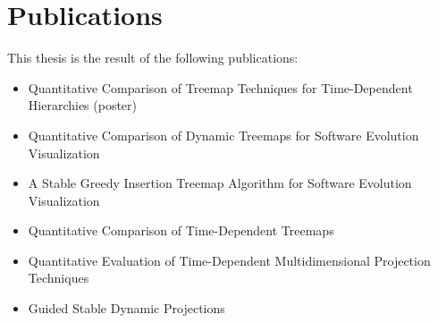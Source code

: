 \begingroup
\let\clearpage\relax
\let\cleardoublepage\relax
\let\cleardoublepage\relax

\manualmark
{} 

\chapter*{Publications}
This thesis is the result of the following publications:
\begin{itemize}
\item Quantitative Comparison of Treemap Techniques for Time-Dependent Hierarchies (poster) ~\citep{vernier17}
\item Quantitative Comparison of Dynamic Treemaps for Software Evolution Visualization~\citep{vernier18software}
\item A Stable Greedy Insertion Treemap Algorithm for Software Evolution Visualization~\citep{vernier18git}
\item Quantitative Comparison of Time-Dependent Treemaps~\citep{vernier_treemap}
\item Quantitative Evaluation of Time-Dependent Multidimensional Projection Techniques~\citep{Vernier2020}
\item Guided Stable Dynamic Projections~\citep{Vernier2021}
\end{itemize}


\endgroup
